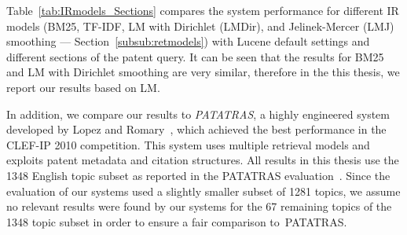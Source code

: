 Table~\ref{tab:IRmodels_Sections} compares the system performance for different IR models 
(BM25, TF-IDF, LM with Dirichlet (LMDir), and Jelinek-Mercer (LMJ) smoothing --- Section~\ref{subsub:retmodels}) with Lucene default settings and different sections of the patent query.
It can be seen that the results for BM25 and LM with Dirichlet smoothing are very similar, therefore in the this thesis, we report our results based on LM.    

In addition, we compare our results to \textit{PATATRAS}, a highly engineered system developed by Lopez and Romary~\cite{lopez2010experiments}, 
which achieved the best performance in the CLEF-IP 2010 competition. This system uses multiple retrieval models %
and exploits patent metadata and citation structures.  All results in this thesis use the 1348 English topic subset as reported in the PATATRAS evaluation~\citep{piroi2010clef}.  Since the evaluation of our systems used a slightly smaller subset of 1281 topics, we assume no relevant results were found by our systems for the 67 remaining topics of the 1348 topic subset in order to ensure a fair comparison to~PATATRAS.


% 

